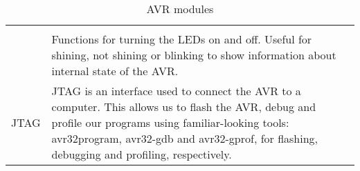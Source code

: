 \begin{table}[htbp]
\begin{tabular}{l|p{10cm}}
\begin{comment}
	a thin simplification layer built on top of GPIO that handles the
	interrupts and button click callbacks. \CHECK{this does not exists as of
	right now, but it might in the future :)}\\
\end{comment}
	LEDs & Functions for turning the LEDs on and off. Useful for shining, not shining or
	blinking to show information about internal state of the AVR. \\
	\hline
	JTAG & JTAG is an interface used to connect the AVR to a computer. This
	allows us to flash the AVR, debug and profile our programs using
	familiar-looking tools: avr32program, avr32-gdb and avr32-gprof,
	for flashing, debugging and profiling, respectively. \\
\end{tabular}
\caption{AVR modules}
\label{tab:asdasd}
\end{table}
\begin{comment}
\TODO{FAT: reference to comparison benchmarks in appendix?}
\TODO{FGPA/GPIO: more?}
\TODO{Button: predictive writing is never a good idea, that's a surefire way of ending up with outright wrong/contradictive things in our report.}
\TODO{Program: This isn't really a library then, is it?}
\TODO{BMP: Should we remove it? It was like a 10 minute job to make and is utterly useless now...} 
\TODO{SMC/EBI: What? The INTERNAL sram is on the EXTERNAL bus interface? That makes no sense!}
\TODO{JTAG: what use have we had of avr32-gdb and avr32-gprof? Is use of these described in the report? if not why are we mentioning them?}
\end{comment}
